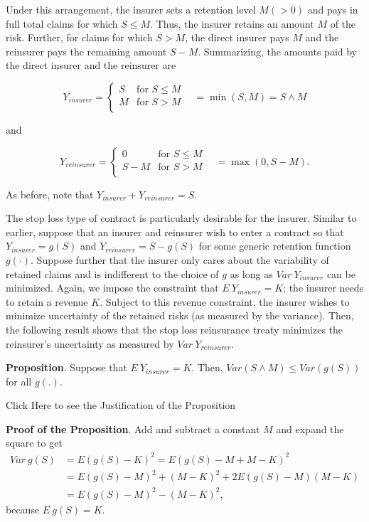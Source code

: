\documentclass[]{book}
\theoremstyle{definition}
\theoremstyle{definition}
\theoremstyle{definition}
\theoremstyle{remark}
\begin{document}
Under this arrangement, the insurer sets a retention level \(M (>0)\)
and pays in full total claims for which \(S \le M\). Thus, the insurer
retains an amount \(M\) of the risk. Further, for claims for which
\(S > M\), the direct insurer pays \(M\) and the reinsurer pays the
remaining amount \(S-M\). Summarizing, the amounts paid by the direct
insurer and the reinsurer are

\[
Y_{insurer} =
\begin{cases}
S & \text{for } S \le M\\
M & \text{for } S >M \\
\end{cases} \ \ \ \ = \min(S,M) = S \wedge M
\]

and

\[
Y_{reinsurer} =
\begin{cases}
0 & \text{for } S \le M\\
S- M &  \text{for } S >M \\
\end{cases} \ \ \ \  = \max(0,S-M) .
\]

As before, note that \(Y_{insurer}+Y_{reinsurer}=S\).

The stop loss type of contract is particularly desirable for the
insurer. Similar to earlier, suppose that an insurer and reinsurer wish
to enter a contract so that \(Y_{insurer}=g(S)\) and
\(Y_{reinsurer}=S-g(S)\) for some generic retention function
\(g(\cdot)\). Suppose further that the insurer only cares about the
variability of retained claims and is indifferent to the choice of \(g\)
as long as \(Var~Y_{insurer}\) can be minimized. Again, we impose the
constraint that \(E ~Y_{insurer} = K\); the insurer needs to retain a
revenue \(K\). Subject to this revenue constraint, the insurer wishes to
minimize uncertainty of the retained risks (as measured by the
variance). Then, the following result shows that the stop loss
reinsurance treaty minimizes the reinsurer's uncertainty as measured by
\(Var~Y_{reinsurer}\).

\textbf{Proposition}. Suppose that \(E~Y_{insurer}=K.\) Then,
\(Var (S \wedge M) \le Var(g(S))\) for all \(g(.)\).

Click Here to see the Justification of the Proposition

\hypertarget{toggleProofStopLoss}{}
\textbf{Proof of the Proposition}. Add and subtract a constant \(M\) and
expand the square to get \[
\begin{array}{ll}
Var~ g(S) &= E (g(S) - K)^2 = E (g(S) -M +M- K)^2 \\
&= E (g(S) -M)^2 +  (M- K)^2 +2 E (g(S) -M)(M- K) \\
&= E (g(S) -M)^2 -  (M- K)^2 ,
\end{array}
\] because \(E ~g(S)= K.\)
\end{document}
